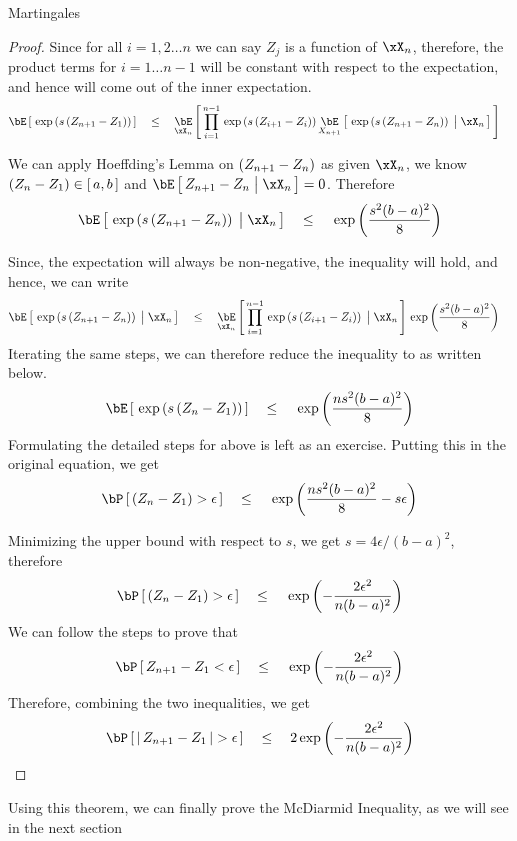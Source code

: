 \documentclass[11pt,a4paper]{article}
\begin{document}
\begin{ssection}{Martingales}
\begin{proof}
		Since for all $i = 1, 2 \dots n$ we can say $Z_j$ is a function of $\xX_n$, therefore, the product terms for $i = 1 \dots n - 1$ will be constant with respect to the expectation, and hence will come out of the inner expectation.
		\begin{align*}
			\E{\texp{s \para{Z_{n + 1} - Z_1}}} & \qle	\E[\xX_n]{\prod_{i = 1}^{n - 1} \texp{s \para{Z_{i + 1} - Z_i}} \E[X_{n + 1}]{\texp{s \para{Z_{n + 1} - Z_n}} \pipe \xX_n}} 
		\end{align*}
		
		We can apply Hoeffding's Lemma on $\left( {Z_{n + 1} - Z_n} \right)$ as given $\xX_n$, we know $\left( {Z_n - Z_1} \right) \in \left[\,{a, b}\,\right]$ and $\E{Z_{n+1} - Z_n \pipe \xX_n} = 0$. Therefore
		\begin{align*}
			\E{\texp{s \para{Z_{n + 1} - Z_n}} \pipe \xX_n}	\qle	\texp{\frac{s^2 (b - a)^2}{8}} 
		\end{align*}
		
		Since, the expectation will always be non-negative, the inequality will hold, and hence, we can write
		\begin{align*}
			\E{\texp{s \para{Z_{n + 1} - Z_n}} \pipe \xX_n} & \qle	\E[\xX_n]{\prod_{i = 1}^{n - 1} \texp{s \para{Z_{i + 1} - Z_i}} \pipe \xX_n} \texp{\frac{s^2 (b - a)^2}{8}} 
		\end{align*}
		Iterating the same steps, we can therefore reduce the inequality to as written below.
		\begin{align*}
			\E{\texp{s \para{Z_n - Z_1}}}	\qle	\texp{\frac{n s^2 (b - a)^2}{8}} 
		\end{align*}
		Formulating the detailed steps for above is left as an exercise. Putting this in the original equation, we get
		\begin{align*}
			\prob{\para{Z_n - Z_1} > \epsilon}	\qle	\texp{\frac{n s^2 (b - a)^2}{8} - s \epsilon} 
		\end{align*}
		
		Minimizing the upper bound with respect to $s$, we get $s = 4 \epsilon / (b - a)^2$, therefore
		\begin{align*}
			\prob{\para{Z_n - Z_1} > \epsilon}	\qle	\texp{- \frac{2 \epsilon^2}{n (b - a)^2}} 
		\end{align*}
		We can follow the steps to prove that
		\begin{align*}
			\prob{Z_{n + 1} - Z_1 < \epsilon}	\qle	\texp{- \frac{2 \epsilon^2}{n (b - a)^2}} 
		\end{align*}
		Therefore, combining the two inequalities, we get
		\begin{align*}
			\prob{\abs{Z_{n + 1} - Z_1} > \epsilon}	\qle	2 \texp{- \frac{2 \epsilon^2}{n (b - a)^2}} 
		\end{align*}
	\end{proof}
	
	
	Using this theorem, we can finally prove the McDiarmid Inequality, as we will see in the next section
	
\end{ssection}
\end{document}

